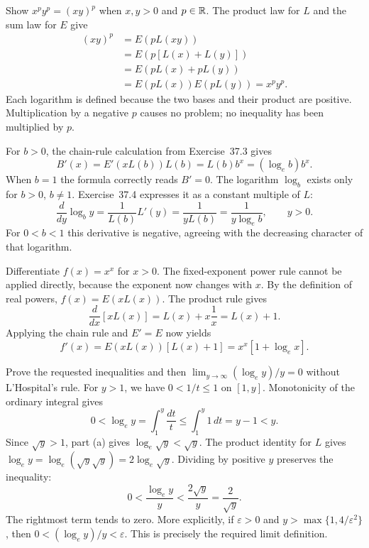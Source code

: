 \goal Show $x^p y^p=(xy)^p$ when $x,y>0$ and $p\in\mathbb{R}$.
The product law for $L$ and the sum law for $E$ give
\begin{align*}
 (xy)^p
 &=E(pL(xy))\\
 &=E(p[L(x)+L(y)])\\
 &=E(pL(x)+pL(y))\\
 &=E(pL(x))E(pL(y))=x^p y^p.
\end{align*}
Each logarithm is defined because the two bases and their product
are positive. Multiplication by a negative $p$ causes no problem;
no inequality has been multiplied by $p$.

For $b>0$, the chain-rule calculation from Exercise~37.3 gives
\[
 B'(x)=E'(xL(b))L(b)=L(b)b^x=(\log_e b)b^x.
\]
When $b=1$ the formula correctly reads $B'=0$.
The logarithm $\log_b$ exists only for $b>0$, $b\ne1$.
Exercise~37.4 expresses it as a constant multiple of $L$:
\[
 \frac{d}{dy}\log_b y
 =\frac{1}{L(b)}L'(y)
 =\frac{1}{yL(b)}=\frac{1}{y\log_e b},\qquad y>0.
\]
For $0<b<1$ this derivative is negative, agreeing with the
decreasing character of that logarithm.

\goal Differentiate $f(x)=x^x$ for $x>0$.
\idea The fixed-exponent power rule cannot be applied directly,
because the exponent now changes with $x$.
By the definition of real powers, $f(x)=E(xL(x))$. The product
rule gives
\[
 \frac{d}{dx}[xL(x)]=L(x)+x\frac1x=L(x)+1.
\]
Applying the chain rule and $E'=E$ now yields
\[
 f'(x)=E(xL(x))[L(x)+1]=x^x[1+\log_e x].
\]

\goal Prove the requested inequalities and then
$\lim_{y\to\infty}(\log_e y)/y=0$ without L'Hospital's rule.
For $y>1$, we have $0<1/t\leq1$ on $[1,y]$. Monotonicity of
the ordinary integral gives
\[
 0<\log_e y=\int_1^y\frac{dt}{t}\leq\int_1^y1\,dt=y-1<y.
\]
Since $\sqrt y>1$, part (a) gives $\log_e\sqrt y<\sqrt y$.
The product identity for $L$ gives
$\log_e y=\log_e(\sqrt y\sqrt y)=2\log_e\sqrt y$.
Dividing by positive $y$ preserves the inequality:
\[
 0<\frac{\log_e y}{y}
 <\frac{2\sqrt y}{y}=\frac2{\sqrt y}.
\]
The rightmost term tends to zero. More explicitly, if
$\varepsilon>0$ and $y>\max\{1,4/\varepsilon^2\}$, then
$0<(\log_e y)/y<\varepsilon$. This is precisely the required
limit definition.
